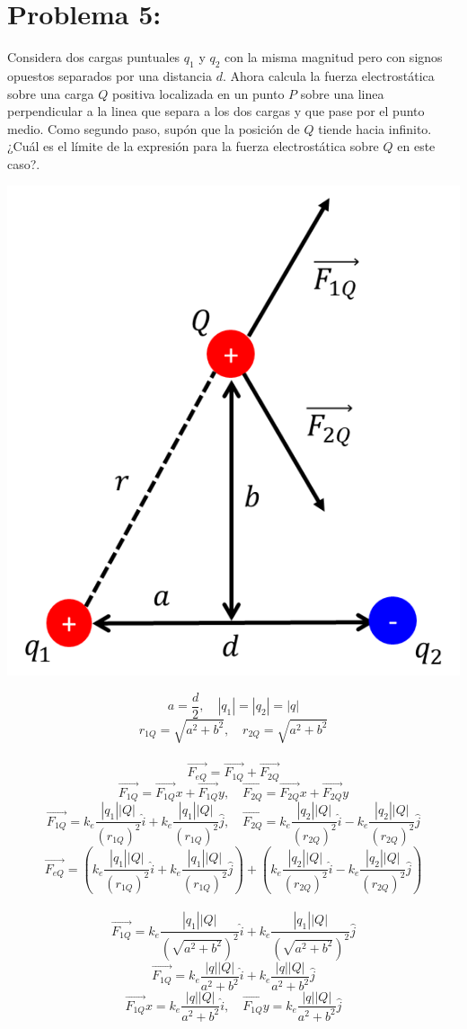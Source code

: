 \documentclass[12pt]{article}
\begin{document}
		\section{Problema 5:}\label{sec:Problema5}
			Considera dos cargas puntuales $ q_1 $ y $ q_2 $ con la misma magnitud pero con signos
			opuestos separados por una distancia $ d $. Ahora calcula la fuerza electrostática sobre
			una carga $ Q $ positiva localizada en un punto $ P $ sobre una linea perpendicular a la
			linea que separa a los dos cargas y que pase por el punto medio. Como segundo paso,
			supón que la posición de $ Q $ tiende hacia infinito. ¿Cuál es el límite de la expresión
			para la fuerza electrostática sobre $ Q $ en este caso?.	
			\begin{center}
				\includegraphics[width=.4\linewidth]{Imp5t1.png} 
			\end{center}
			$$ a = \frac{d}{2}, \quad |q_1| = |q_2| = |q| $$
			$$ r_{1Q} = \sqrt{a^2+b^2}, \quad r_{2Q} = \sqrt{a^2+b^2} $$ \\
			$$ \vec{F_{eQ}} = \vec{F_{1Q}} + \vec{F_{2Q}} $$
			$$ \vec{F_{1Q}} = \vec{F_{1Q}}x + \vec{F_{1Q}}y, \quad \vec{F_{2Q}} = \vec{F_{2Q}}x + \vec{F_{2Q}}y$$
			$$ \vec{F_{1Q}} = k_e \frac{|q_1||Q|}{(r_{1Q})^2} \hat{i} + k_e \frac{|q_1||Q|}{(r_{1Q})^2} \hat{j}, \quad 
			\vec{F_{2Q}} = k_e \frac{|q_2||Q|}{(r_{2Q})^2} \hat{i} - k_e \frac{|q_2||Q|}{(r_{2Q})^2} \hat{j}$$
			$$ \vec{F_{eQ}} = \left( k_e \frac{|q_1||Q|}{(r_{1Q})^2} \hat{i} + k_e \frac{|q_1||Q|}{(r_{1Q})^2} \hat{j} \right) 
			+ \left( k_e \frac{|q_2||Q|}{(r_{2Q})^2} \hat{i} - k_e \frac{|q_2||Q|}{(r_{2Q})^2} \hat{j} \right) $$ \\
			$$ \vec{F_{1Q}} = k_e \frac{|q_1||Q|}{(\sqrt{a^2+b^2})^2} \hat{i} + k_e \frac{|q_1||Q|}{(\sqrt{a^2+b^2})^2} \hat{j} $$
			$$ \vec{F_{1Q}} = k_e \frac{|q||Q|}{a^2+b^2} \hat{i} + k_e \frac{|q||Q|}{a^2+b^2} \hat{j} $$
			$$ \vec{F_{1Q}}x = k_e \frac{|q||Q|}{a^2+b^2} \hat{i}, \quad \vec{F_{1Q}}y = k_e \frac{|q||Q|}{a^2+b^2} \hat{j} $$ \\
\end{document}
